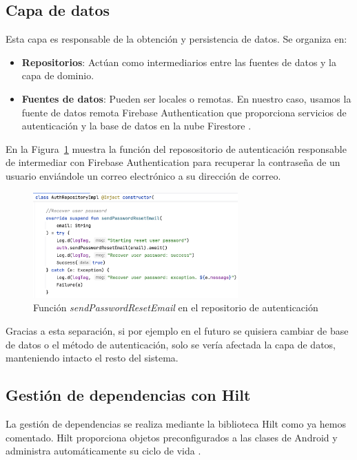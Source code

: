 \subsection{Capa de datos}

Esta capa es responsable de la obtención y persistencia de datos. Se organiza en:

\begin{itemize}
    \item \textbf{Repositorios}: Actúan como intermediarios entre las fuentes de datos y la capa de dominio.
    \item \textbf{Fuentes de datos}: Pueden ser locales o remotas. En nuestro caso, usamos la fuente de datos remota Firebase Authentication que proporciona servicios de autenticación y la base de datos en la nube Firestore \cite{firestore, firebase-auth}.
\end{itemize}

En la Figura~\ref{fig:recoverPassRepo} muestra la función del reposositorio de autenticación responsable de intermediar con Firebase Authentication para recuperar la contraseña de un usuario enviándole un correo electrónico a su dirección de correo.

\begin{figure}[H]
\centering
\includegraphics[width=0.7\textwidth]{./img/description/recoverPassRepo.png}
\caption{Función \textit{sendPasswordResetEmail} en el repositorio de autenticación}
\label{fig:recoverPassRepo}
\end{figure}

Gracias a esta separación, si por ejemplo en el futuro se quisiera cambiar de base de datos o el método de autenticación, solo se vería afectada la capa de datos, manteniendo intacto el resto del sistema.

\subsection{Gestión de dependencias con Hilt}

La gestión de dependencias se realiza mediante la biblioteca Hilt como ya hemos comentado. Hilt proporciona objetos preconfigurados a las clases de Android y administra automáticamente su ciclo de vida \cite{hilt}.

